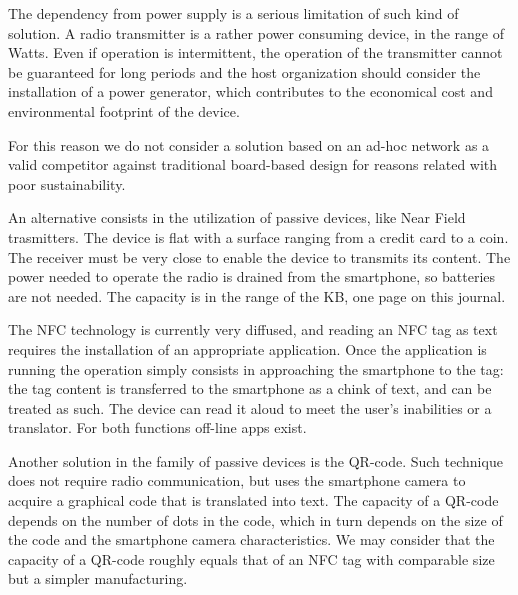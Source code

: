 \documentclass[sustainability,article,submit,pdftex,moreauthors]{Definitions/mdpi}
\begin{document}
The dependency from power supply is a serious limitation of such kind of solution. A radio transmitter is a rather power consuming device, in the range of Watts. Even if operation is intermittent, the operation of the transmitter cannot be guaranteed for long periods and the host organization should consider the installation of a power generator, which contributes to the economical cost and environmental footprint of the device.

For this reason we do not consider a solution based on an ad-hoc network as a valid competitor against traditional board-based design for reasons related with poor sustainability.

An alternative consists in the utilization of passive devices, like Near Field trasmitters. The device is flat with a surface ranging from a credit card to a coin. The receiver must be very close to enable the device to transmits its content. The power needed to operate the radio is drained from the smartphone, so batteries are not needed. The capacity is in the range of the KB, one page on this journal.

The NFC technology is currently very diffused, and reading an NFC tag as text requires the installation of an appropriate application. Once the application is running the operation simply consists in approaching the smartphone to the tag: the tag content is transferred to the smartphone as a chink of text, and can be treated as such. The device can read it aloud to meet the user's inabilities or a translator. For both functions off-line apps exist.

Another solution in the family of passive devices is the QR-code. Such technique does not require radio communication, but uses the smartphone camera to acquire a graphical code that is translated into text. The capacity of a QR-code depends on the number of dots in the code, which in turn depends on the size of the code and the smartphone camera characteristics. We may consider that the capacity of a QR-code roughly equals that of an NFC tag with comparable size but a simpler manufacturing.
\end{document}
